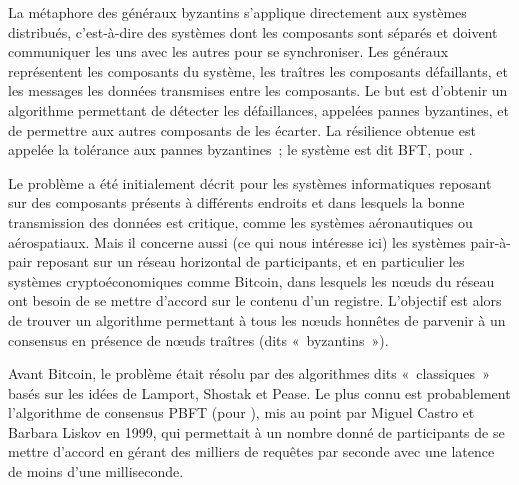 
La métaphore des généraux byzantins s'applique directement aux systèmes distribués, c'est-à-dire des systèmes dont les composants sont séparés et doivent communiquer les uns avec les autres pour se synchroniser. Les généraux représentent les composants du système, les traîtres les composants défaillants, et les messages les données transmises entre les composants. Le but est d'obtenir un algorithme permettant de détecter les défaillances, appelées pannes byzantines, et de permettre aux autres composants de les écarter. La résilience obtenue est appelée la tolérance aux pannes byzantines~; le système est dit BFT, pour .

Le problème a été initialement décrit pour les systèmes informatiques reposant sur des composants présents à différents endroits et dans lesquels la bonne transmission des données est critique, comme les systèmes aéronautiques ou aérospatiaux. Mais il concerne aussi (ce qui nous intéresse ici) les systèmes pair-à-pair reposant sur un réseau horizontal de participants, et en particulier les systèmes cryptoéconomiques comme Bitcoin, dans lesquels les nœuds du réseau ont besoin de se mettre d'accord sur le contenu d'un registre. L'objectif est alors de trouver un algorithme permettant à tous les nœuds honnêtes de parvenir à un consensus en présence de nœuds traîtres (dits «~byzantins~»).



Avant Bitcoin, le problème était résolu par des algorithmes dits «~classiques~» basés sur les idées de Lamport, Shostak et Pease. Le plus connu est probablement l'algorithme de consensus PBFT (pour ), mis au point par Miguel Castro et Barbara Liskov en 1999, qui permettait à un nombre donné de participants de se mettre d'accord en gérant des milliers de requêtes par seconde avec une latence de moins d'une milliseconde.


